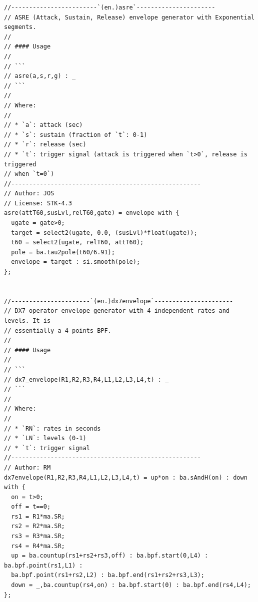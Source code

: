 \documentclass{article}
\begin{document}
\begin{lstlisting}[caption=\texttt{envelopes.lib}]
//------------------------`(en.)asre`----------------------
// ASRE (Attack, Sustain, Release) envelope generator with Exponential segments.
//
// #### Usage
//
// ```
// asre(a,s,r,g) : _
// ```
//
// Where:
//
// * `a`: attack (sec)
// * `s`: sustain (fraction of `t`: 0-1) 
// * `r`: release (sec)
// * `t`: trigger signal (attack is triggered when `t>0`, release is triggered 
// when `t=0`)
//-----------------------------------------------------
// Author: JOS
// License: STK-4.3
asre(attT60,susLvl,relT60,gate) = envelope with {
  ugate = gate>0;
  target = select2(ugate, 0.0, (susLvl)*float(ugate));
  t60 = select2(ugate, relT60, attT60);
  pole = ba.tau2pole(t60/6.91);
  envelope = target : si.smooth(pole);
};


//----------------------`(en.)dx7envelope`----------------------
// DX7 operator envelope generator with 4 independent rates and levels. It is
// essentially a 4 points BPF.
//
// #### Usage
//
// ```
// dx7_envelope(R1,R2,R3,R4,L1,L2,L3,L4,t) : _
// ```
//
// Where:
//
// * `RN`: rates in seconds
// * `LN`: levels (0-1)
// * `t`: trigger signal
//-----------------------------------------------------
// Author: RM
dx7envelope(R1,R2,R3,R4,L1,L2,L3,L4,t) = up*on : ba.sAndH(on) : down
with {
  on = t>0;
  off = t==0;
  rs1 = R1*ma.SR;
  rs2 = R2*ma.SR;
  rs3 = R3*ma.SR;
  rs4 = R4*ma.SR;
  up = ba.countup(rs1+rs2+rs3,off) : ba.bpf.start(0,L4) : ba.bpf.point(rs1,L1) :
  ba.bpf.point(rs1+rs2,L2) : ba.bpf.end(rs1+rs2+rs3,L3);
  down = _,ba.countup(rs4,on) : ba.bpf.start(0) : ba.bpf.end(rs4,L4);
};
\end{lstlisting}
\end{document}
